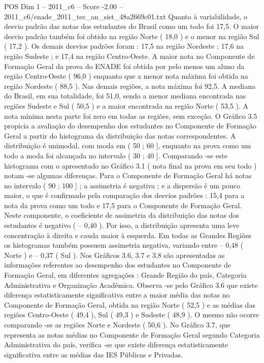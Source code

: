 \begin{textsample}{POS Dim 1 – 2011\_c6 – Score -2.00 – 2011\_c6/enade\_2011\_tec\_an\_sist\_48a2669c01.txt}
Quanto à variabilidade, o desvio padrão das notas dos estudantes do Brasil como um todo foi 17,5.
O maior desvio padrão também foi obtido na região Norte ( 18,0 ) e o menor na região Sul ( 17,2 ).
Os demais desvios padrões foram : 17,5 na região Nordeste ; 17,6 na região Sudeste ; e 17,4 na região Centro-Oeste.
A maior nota no Componente de Formação Geral da prova do ENADE foi obtida por pelo menos um aluno da região Centro-Oeste ( 96,0 ) enquanto que a menor nota máxima foi obtida na região Nordeste ( 88,5 ).
Nas demais regiões, a nota máxima foi 92,5.
A mediana do Brasil, em sua totalidade, foi 51,0, sendo a menor mediana encontrada nas regiões Sudeste e Sul ( 50,5 ) e a maior encontrada na região Norte ( 53,5 ).
A nota mínima nesta parte foi zero em todas as regiões, sem exceção.
O Gráfico 3.5 propicia a avaliação do desempenho dos estudantes no Componente de Formação Geral a partir do histograma da distribuição das notas correspondentes.
A distribuição é unimodal, com moda em ( 50 ; 60 ], enquanto na prova como um todo a moda foi alcançada no intervalo ( 30 ; 40 ].
Comparando -se este histograma com o apresentado no Gráfico 3.1 ( nota final na prova em seu todo ) notam -se algumas diferenças.
Para o Componente de Formação Geral há notas no intervalo ( 90 ; 100 ] ; a assimetria é negativa ; e a dispersão é um pouco maior, o que é confirmado pela comparação dos desvios padrões : 15,4 para a nota da prova como um todo e 17,5 para o Componente de Formação Geral.
Neste componente, o coeficiente de assimetria da distribuição das notas dos estudantes é negativo ( – 0,40 ).
Por isso, a distribuição apresenta uma leve concentração à direita e cauda maior à esquerda.
Em todas as Grandes Regiões os histogramas também possuem assimetria negativa, variando entre – 0,48 ( Norte ) e – 0,37 ( Sul ).
Nos Gráficos 3.6, 3.7 e 3.8 são apresentadas as informações referentes ao desempenho dos estudantes no Componente de Formação Geral, em diferentes agregações : Grande Região do país, Categoria Administrativa e Organização Acadêmica.
Observa -se pelo Gráfico 3.6 que existe diferença estatisticamente significativa entre a maior média das notas no Componente de Formação Geral, obtida na região Norte ( 52,5 ) e as médias das regiões Centro-Oeste ( 49,4 ), Sul ( 49,3 ) e Sudeste ( 48,9 ).
O mesmo não ocorre comparando -se as regiões Norte e Nordeste ( 50,6 ).
No Gráfico 3.7, que representa as notas médias no Componente de Formação Geral segundo Categoria Administrativa do país, verifica -se que existe diferença estatisticamente significativa entre as médias das IES Públicas e Privadas.

\end{textsample}
